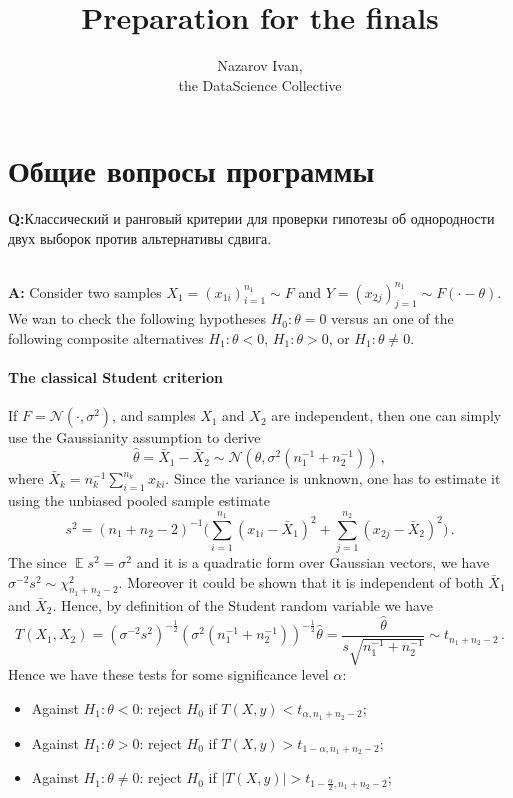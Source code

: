 \documentclass[a4paper]{article}
\title{Preparation for the finals}
\author{Nazarov Ivan, \rus{101мНОД(ИССА)}\\the DataScience Collective}
\newcommand{\Ncal}{\mathcal{N}}
\newcommand{\ex}{\mathop{\mathbb{E}}\nolimits}
\newcommand{\rus}[1]{\foreignlanguage{russian}{#1}}
\begin{document}
\maketitle


\section{\rus{Общие вопросы программы}} %
\label{sec:general_questions}
\noindent\textbf{Q:}\rus{Классический и ранговый критерии для проверки гипотезы об
однородности двух выборок против альтернативы сдвига.}

\hfill\\\noindent\textbf{A:}
Consider two samples $X_1=(x_{1i})_{i=1}^{n_1}\sim F$ and $Y=(x_{2j})_{j=1}^{n_1}
\sim F(\cdot - \theta)$. We wan to check the following hypotheses $H_0: \theta=0$
versus an one of the following composite alternatives $H_1:\theta < 0$, $H_1:\theta > 0$,
or $H_1:\theta \neq 0$.

\paragraph{The classical Student criterion} %
\label{par:the_classical_student_criterion}

If $F = \Ncal(\cdot, \sigma^2)$, and samples $X_1$ and $X_2$ are independent, then
one can simply use the Gaussianity assumption to derive
$$ \hat{\theta} = \bar{X}_1 - \bar{X}_2
    \sim \Ncal(\theta, \sigma^2 (n_1^{-1} + n_2^{-1}))
    \,, $$
where $\bar{X}_k = n_k^{-1} \sum_{i=1}^{n_k} x_{ki}$. Since the variance is unknown,
one has to estimate it using the unbiased pooled sample estimate
$$ s^2
    = (n_1 + n_2 - 2)^{-1}\bigl(
        \sum_{i=1}^{n_1} (x_{1i} - \bar{X}_1)^2
        + \sum_{j=1}^{n_2} (x_{2j}- \bar{X}_2)^2
        \bigr)
    \,. $$
The since $\ex s^2 = \sigma^2$ and it is a quadratic form over Gaussian vectors,
we have $\sigma^{-2} s^2 \sim \chi^2_{n_1 + n_2 - 2}$. Moreover it could be shown
that it is independent of both $\bar{X}_1$ and $\bar{X}_2$. Hence, by definition
of the Student random variable we have
$$ T(X_1, X_2)
    = (\sigma^{-2} s^2)^{-\frac{1}{2}}
      (\sigma^2 (n_1^{-1} + n_2^{-1}))^{-\frac{1}{2}} \hat{\theta}
    = \frac{\hat{\theta}}{s \sqrt{n_1^{-1} + n_2^{-1}}}
    \sim t_{n_1 + n_2 - 2}
    \,. $$
Hence we have these tests for some significance level $\alpha$:\begin{itemize}
    \item Against $H_1:\theta < 0$: reject $H_0$ if $T(X, y) < t_{\alpha, n_1 + n_2 - 2}$;
    \item Against $H_1:\theta > 0$: reject $H_0$ if $T(X, y) > t_{1-\alpha, n_1 + n_2 - 2}$;
    \item Against $H_1:\theta \neq 0$: reject $H_0$ if $|T(X, y)| > t_{1-\frac{\alpha}{2}, n_1 + n_2 - 2}$;
\end{itemize}
\end{document}
